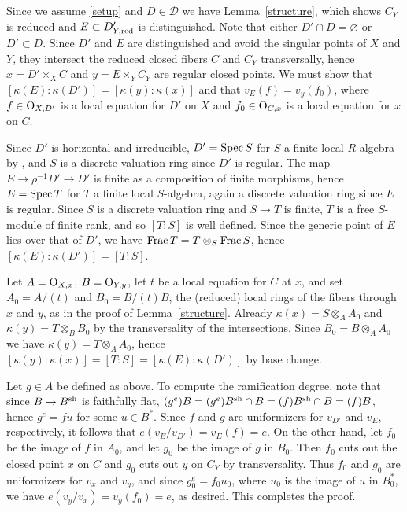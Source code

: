 \documentclass{amsart}
\theoremstyle{plain}
\theoremstyle{definition}
\theoremstyle{remark}
\numberwithin{equation}{section}%
\renewcommand{\O}{{\text{\rm O}}}
\newcommand{\red}{{\text{\rm red}}}
\newcommand{\sh}{{\text{\rm sh}}}
\newcommand{\Frac}{{\text{\rm Frac}\,}}
\newcommand{\Pf}{{\noindent{\it Proof.}\;\;}}
\newcommand{\Spec}{{\text{\rm Spec}\,}}
\begin{document}
\Pf
Since we assume \eqref{setup} and $D\in\mathscr D$ we have Lemma~\ref{structure},
which shows $C_Y$ is reduced and $E\subset D_{Y,\red}'$ is distinguished.
Note that either $D'\cap D=\varnothing$ or $D'\subset D$.
Since $D'$ and $E$ are distinguished and avoid the singular points of $X$ and $Y$,
they intersect the reduced closed fibers $C$ and $C_Y$ transversally, hence
$x=D'\times_X C$ and $y=E\times_Y C_Y$ are regular closed points.
We must show that $[\kappa(E):\kappa(D')]=[\kappa(y):\kappa(x)]$
and that $v_E(f)=v_y(f_0)$, where $f\in\O_{X,D'}$ is a local equation for $D'$ on $X$
and $f_0\in\O_{C,x}$ is a local equation for $x$ on $C$. 
 
Since $D'$ is horizontal and irreducible, 
$D'=\Spec S$ for $S$ a finite local $R$-algebra by \cite[I.4.2]{M},
and $S$ is a discrete valuation ring since $D'$ is regular.
The map $E\to\rho^{-1}D'\to D'$ is finite as a composition of finite morphisms, hence
$E=\Spec T$ for $T$ a finite local $S$-algebra, again a discrete valuation ring since
$E$ is regular.
Since $S$ is a discrete valuation ring and $S\to T$ is finite, $T$ is a free $S$-module of finite
rank, and so $[T:S]$ is well defined.
Since the generic point of $E$ lies over that of $D'$, we have $\Frac T=T\otimes_S\Frac S$,
hence $[\kappa(E):\kappa(D')]=[T:S]$.

Let $A=\O_{X,x}$, $B=\O_{Y,y}$,
let $t$ be a local equation for $C$ at $x$, and
set $A_0=A/(t)$ and $B_0=B/(t)B$, the (reduced) local rings of the fibers 
through $x$ and $y$, as in the proof of Lemma~\ref{structure}.
Already $\kappa(x)=S\otimes_A A_0$ and $\kappa(y)=T\otimes_B B_0$
by the transversality of the intersections.
Since $B_0=B\otimes_A A_0$ we have
$\kappa(y)=T\otimes_A A_0$,
hence $[\kappa(y):\kappa(x)]=[T:S]=[\kappa(E):\kappa(D')]$ by base change.

Let $g\in A$ be defined as above.
To compute the ramification degree, note that since $B\to B^\sh$ is faithfully flat, 
$(g^e)B=(g^e)B^\sh\cap B=(f)B^\sh\cap B=(f)B$,
hence $g^e=fu$ for some $u\in B^*$.
Since $f$ and $g$ are uniformizers for $v_{D'}$ and $v_{E}$, respectively, it follows that
$e(v_{E}/v_{D'})=v_{E}(f)=e$.
On the other hand, let $f_0$ be the image of $f$ in $A_0$, and let
$g_0$ be the image of $g$ in $B_0$. 
Then $f_0$ cuts out the closed point $x$ on $C$
and $g_0$ cuts out $y$ on $C_Y$ by transversality.
Thus $f_0$ and $g_0$ are uniformizers for $v_x$ and $v_y$, and since $g_0^e=f_0 u_0$,
where $u_0$ is the image of $u$ in $B_0^*$,
we have $e(v_y/v_x)=v_y(f_0)=e$, as desired.
This completes the proof.
\end{document}
